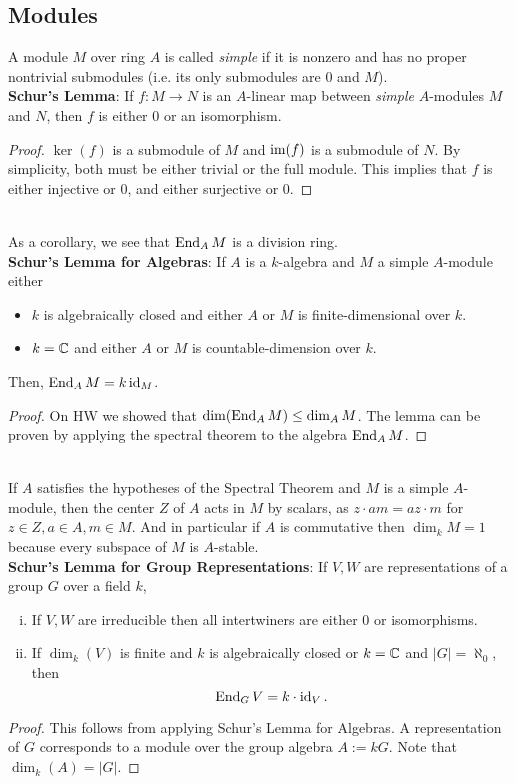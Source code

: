 \documentclass{amsart}
\begin{document}
\subsection{Modules}

A module $M$ over ring $A$ is called \textit{simple} if it is nonzero and has no proper nontrivial submodules (i.e. its only submodules are $0$ and $M$).\\

\noindent \textbf{Schur's Lemma}: If $f:M\to N$ is an $A$-linear map between \textit{simple} $A$-modules $M$ and $N$, then $f$ is either $0$ or an isomorphism.
\begin{proof}
	$\ker(f)$ is a submodule of $M$ and $\operatorname{im}(f)$ is a submodule of $N$. By simplicity, both must be either trivial or the full module. This implies that $f$ is either injective or 0, and either surjective or 0.
\end{proof}\\

As a corollary, we see that $\operatorname{End}_AM$ is a division ring.\\

\noindent \textbf{Schur's Lemma for Algebras}: If $A$ is a $k$-algebra and $M$ a simple $A$-module either 
\begin{itemize}
	\item $k$ is algebraically closed and either $A$ or $M$ is finite-dimensional over $k$.
	\item $k=\mathbb{C}$ and either $A$ or $M$ is countable-dimension over $k$.
\end{itemize}
Then, $\operatorname{End}_AM = k \operatorname{id}_M$.
\begin{proof}
	On HW we showed that $\dim(\operatorname{End}_AM) \leq \dim_A M$. The lemma can be proven by applying the spectral theorem to the algebra $\operatorname{End}_AM$.
\end{proof} \\

If $A$ satisfies the hypotheses of the Spectral Theorem and $M$ is a simple $A$-module, then the center $Z$ of $A$ acts in $M$ by scalars, as $z\cdot am = az\cdot m$ for $z\in Z, a\in A, m\in M$. And in particular if $A$ is commutative then $\dim_k M=1$ because every subspace of $M$ is $A$-stable.\\

\noindent \textbf{Schur's Lemma for Group Representations}: If $V,W$ are representations of a group $G$ over a field $k$,
\begin{enumerate}[(i)]
	\item If $V,W$ are irreducible then all intertwiners are either 0 or isomorphisms.
	\item If $\dim_k(V)$ is finite and $k$ is algebraically closed or $k=\mathbb{C}$ and $|G|=\aleph_0$, then 
	$$
	\operatorname{End}_GV= k\cdot \operatorname{id}_V.
	$$
\end{enumerate}
\begin{proof}
	This follows from applying Schur's Lemma for Algebras. A representation of $G$ corresponds to a module over the group algebra $A:= kG$. Note that $\dim_k(A) = |G|$.
\end{proof}\\
\end{document}
